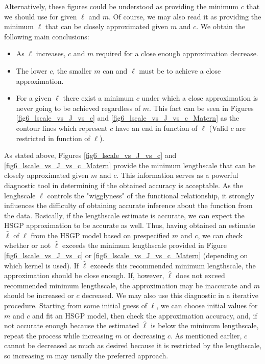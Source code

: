 \documentclass[onecolumn,a4paper,11pt]{article}
\begin{document}
\noindent Alternatively, these figures could be understood as providing the minimum $c$ that we should use for given $\ell$ and $m$. Of course, we may also read it as providing the minimum $\ell$ that can be closely approximated given $m$ and $c$. We obtain the following main conclusions:

\begin{itemize}
\item As $\ell$ increases, $c$ and $m$ required for a close enough approximation decrease.
\item The lower $c$, the smaller $m$ can and $\ell$ must be to achieve a close approximation.
\item For a given $\ell$ there exist a minimum $c$ under which a close approximation is never going to be achieved regardless of $m$. This fact can be seen in Figures \ref{fig6_lscale_vs_J_vs_c} and \ref{fig6_lscale_vs_J_vs_c_Matern} as the contour lines which represent $c$ have an end in function of $\ell$ (Valid $c$ are restricted in function of $\ell$).
\end{itemize}

As stated above, Figures \ref{fig6_lscale_vs_J_vs_c} and \ref{fig6_lscale_vs_J_vs_c_Matern} provide the minimum lengthscale that can be closely approximated given $m$ and $c$. This information serves as a powerful diagnostic tool in determining if the obtained accuracy is acceptable. As the lenghscale $\ell$ controls the "wigglyness" of
the functional relationship, it strongly influences the difficulty of obtaining accurate
inference about the function from the data. Basically, if the lengthscale estimate is accurate, 
we can expect the HSGP approximation to be accurate as well. Thus, having obtained an estimate $\hat{\ell}$ of $\ell$ from the HSGP model based on prespecified $m$ and $c$, we can check whether or not $\hat{\ell}$ exceeds the minimum lengthscale provided in Figure \ref{fig6_lscale_vs_J_vs_c} or \ref{fig6_lscale_vs_J_vs_c_Matern} (depending on which kernel is used). If $\hat{\ell}$ exceeds this recommended minimum lengthscale, the approximation should be close enough. If, however, $\hat{\ell}$ does not exceed recommended minimum lengthscale, the approximation may be inaccurate and $m$ should be increased or $c$ decreased. We may also use this diagnostic in a iterative procedure.
Starting from some initial guess of $\ell$, we can choose initial values for $m$ and $c$ and fit an HSGP model, then check the approximation accuracy, and, if not accurate enough because the estimated $\hat{\ell}$ is below the minimum lengthscale, repeat the process while increasing $m$ or decreasing $c$.
As mentioned earlier, $c$ cannot be decreased as much as desired because it is restricted by the lengthscale, so increasing $m$ may usually the preferred approach.
\end{document}
